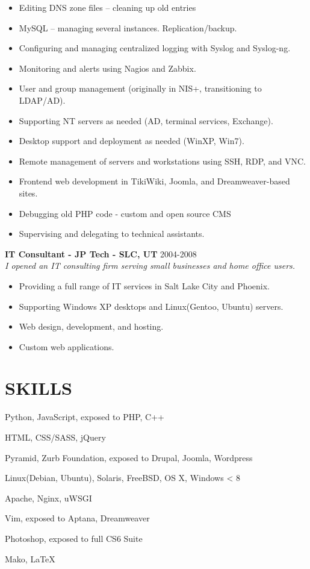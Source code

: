 \documentclass[line,margin]{res}
\begin{document}
\begin{resume}
\begin{itemize}
   \item Editing DNS zone files – cleaning up old entries
   \item MySQL – managing several instances. Replication/backup. 
   \item Configuring and managing centralized logging with Syslog and Syslog-ng.
   \item Monitoring and alerts using Nagios and Zabbix.
   \item User and group management (originally in NIS+, transitioning to LDAP/AD).
   \item Supporting NT servers as needed (AD, terminal services, Exchange).
   \item Desktop support and deployment as needed (WinXP, Win7).
   \item Remote management of servers and workstations using SSH, RDP, and VNC.
   \item Frontend web development in TikiWiki, Joomla, and Dreamweaver-based sites.
   \item Debugging old PHP code - custom and open source CMS
   \item Supervising and delegating to technical assistants.
   \end{itemize}
 {\bf IT Consultant - JP Tech - SLC, UT} \hfill 2004-2008\\
 {\sl I opened an IT consulting firm serving small businesses and home office users.}
  \begin{itemize} \itemsep -2pt
  \item Providing a full range of IT services in Salt Lake City and Phoenix.    
  \item Supporting Windows XP desktops and Linux(Gentoo, Ubuntu) servers.
  \item Web design, development, and hosting.
  \item Custom web applications.
  \end{itemize}

\section{SKILLS}
 \begin{description} \itemsep -2pt
 \item[Development:] Python, JavaScript, exposed to PHP, C++
 \item[Web:] HTML, CSS/SASS, jQuery
 \item[Frameworks:] Pyramid, Zurb Foundation, exposed to Drupal, Joomla, Wordpress
 \item[Operating Systems:] Linux(Debian, Ubuntu), Solaris, FreeBSD, OS X, Windows < 8
 \item[Services:] Apache, Nginx, uWSGI
 \item[Environments:] Vim, exposed to Aptana, Dreamweaver 
 \item[Design:] Photoshop, exposed to full CS6 Suite
 \item[Markup:] Mako, \LaTeX
 \end{description}
					

\end{resume}
\end{document}

